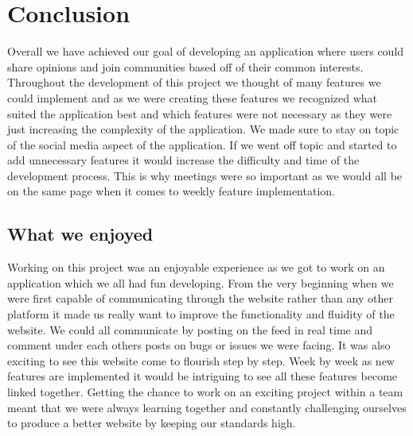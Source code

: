 \chapter{Conclusion}
Overall we have achieved our goal of developing an application where users could share opinions and join communities based off of their common interests. Throughout the development of this project we thought of many features we could implement and as we were creating these features we recognized what suited the application best and which features were not necessary as they were just increasing the complexity of the application. We made sure to stay on topic of the social media aspect of the application. If we went off topic and started to add unnecessary features it would increase the difficulty and time of the development process. This is why meetings were so important as we would all be on the same page when it comes to weekly feature implementation. 

\section{What we enjoyed}
Working on this project was an enjoyable experience as we got to work on an application which we all had fun developing. From the very beginning when we were first capable of communicating through the website rather than any other platform it made us really want to improve the functionality and fluidity of the website. We could all communicate by posting on the feed in real time and comment under each others posts on bugs or issues we were facing. It was also exciting to see this website come to flourish step by step. Week by week as new features are implemented it would be intriguing to see all these features become linked together. Getting the chance to work on an exciting project within a team meant that we were always learning together and constantly challenging ourselves to produce a better website by keeping our standards high.

